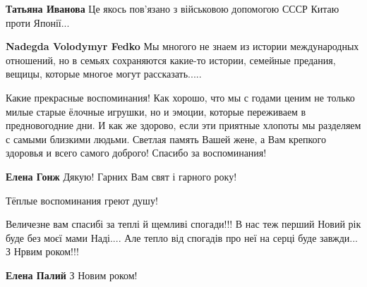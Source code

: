 \begin{itemize}
\begin{itemize}
\begin{itemize}
\textbf{Татьяна Иванова} Це якось пов'язано з військовою допомогою СССР Китаю проти Японії...

\textbf{Nadegda Volodymyr Fedko} Мы многого не знаем из истории международных отношений, но в семьях сохраняются какие-то истории, семейные предания, вещицы, которые многое могут рассказать.....
\end{itemize} %

\end{itemize} %


Какие прекрасные воспоминания! Как хорошо, что мы с годами ценим не только
милые старые ёлочные игрушки, но и эмоции, которые переживаем в предновогодние
дни. И как же здорово, если эти приятные хлопоты мы разделяем с самыми близкими
людьми. Светлая память Вашей жене, а Вам крепкого здоровья и всего самого
доброго! Спасибо за воспоминания!

\textbf{Елена Гонж} Дякую! Гарних Вам свят і гарного року!

Тёплые воспоминания греют душу!


Величезне вам спасибі за теплі й щемливі спогади!!! В нас теж перший Новий рік
буде без моєї мами Наді.... Але тепло від спогадів про неї на серці буде
завжди... З Нрвим роком!!!

\textbf{Елена Палий} З Новим роком!

\end{itemize} %
